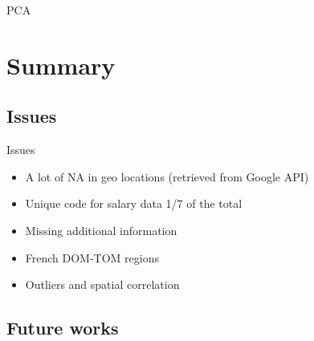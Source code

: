 \documentclass[12pt]{beamer}
\begin{document}
\begin{frame}{\textcolor{bscuro}{PCA}}
	\begin{figure}[!ht] 
		\centering
	\end{figure}
\end{frame}


\section{Summary}


\subsection{Issues}


\begin{frame}{\textcolor{bscuro}{Issues}}
	\begin{itemize}
		\item A lot of NA in geo locations (retrieved from Google API)
		\item Unique code for salary data 1/7 of the total 
		\item Missing additional information 
		\item French DOM-TOM regions
		\item Outliers and spatial correlation
	\end{itemize}
\end{frame}			


\subsection{Future works}
\end{document}
